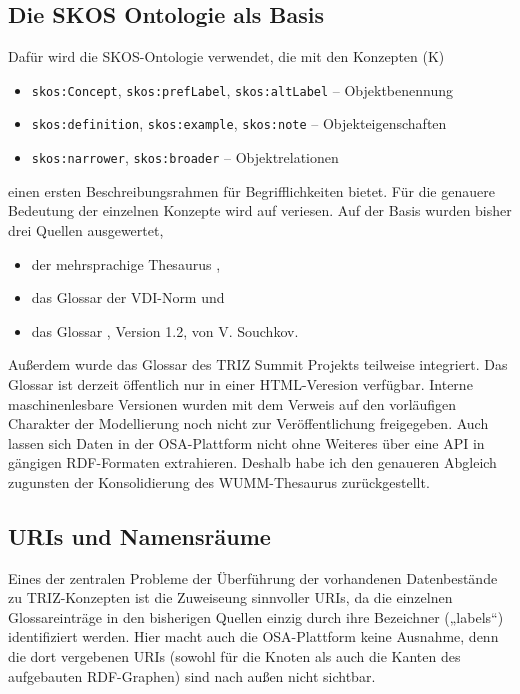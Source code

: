 \documentclass[11pt,a4paper]{article}
\begin{document}
\subsection{Die SKOS Ontologie als Basis}

Dafür wird die SKOS-Ontologie \cite{SKOS} verwendet, die mit den Konzepten (K)
\begin{itemize}[noitemsep]
\item \texttt{skos:Concept}, \texttt{skos:prefLabel}, \texttt{skos:altLabel}
  -- Objektbenennung
\item \texttt{skos:definition}, \texttt{skos:example}, \texttt{skos:note} --
  Objekteigenschaften
\item \texttt{skos:narrower}, \texttt{skos:broader} -- Objektrelationen
\end{itemize}
einen ersten Beschreibungsrahmen für Begrifflichkeiten bietet.  Für die
genauere Bedeutung der einzelnen Konzepte wird auf \cite{SKOS} veriesen.  Auf
der Basis wurden bisher drei Quellen ausgewertet,
\begin{itemize}[noitemsep]
\item der mehrsprachige Thesaurus \cite{GSA},
\item das Glossar der VDI-Norm \cite{VDI} und
\item das Glossar \cite{SG}, Version 1.2, von V. Souchkov.
\end{itemize}
Außerdem wurde das Glossar des TRIZ Summit Projekts teilweise integriert. Das
Glossar ist derzeit öffentlich nur in einer HTML-Veresion verfügbar. Interne
maschinenlesbare Versionen wurden mit dem Verweis auf den vorläufigen
Charakter der Modellierung noch nicht zur Veröffentlichung freigegeben.  Auch
lassen sich Daten in der OSA-Plattform nicht ohne Weiteres über eine API in
gängigen RDF-Formaten extrahieren. Deshalb habe ich den genaueren Abgleich
zugunsten der Konsolidierung des WUMM-Thesaurus zurückgestellt. 

\subsection{URIs und Namensräume}

Eines der zentralen Probleme der Überführung der vorhandenen Datenbestände zu
TRIZ-Konzepten ist die Zuweiseung sinnvoller URIs, da die einzelnen
Glossareinträge in den bisherigen Quellen einzig durch ihre Bezeichner
(„labels“) identifiziert werden.  Hier macht auch die OSA-Plattform keine
Ausnahme, denn die dort vergebenen URIs (sowohl für die Knoten als auch die
Kanten des aufgebauten RDF-Graphen) sind nach außen nicht sichtbar.
\end{document}
